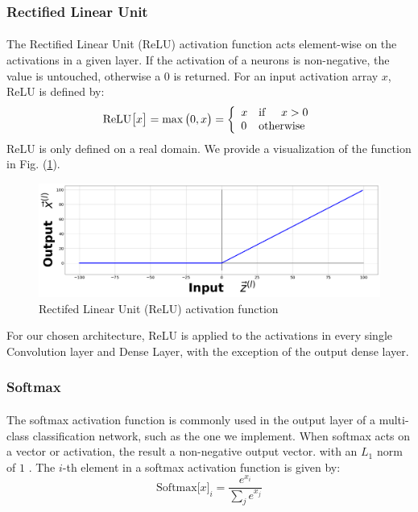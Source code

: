 \documentclass[12pt,letterpaper]{article}
\begin{document}
\subsubsection{Rectified Linear Unit}

\paragraph*{}The Rectified Linear Unit (ReLU) activation function acts element-wise on the activations in a given layer. If the activation of a neurons is non-negative, the value is untouched, otherwise a $0$ is returned. For an input activation array $x$, ReLU is defined by:
\begin{equation}
\label{eqn-ReLU}
\text{ReLU}\big[x\big] = \max\big(0,x\big) = \left\{
\begin{array}{ll}
    x & \text{if\hspace{0.5cm}} x > 0 \\
    0 & \text{otherwise}
\end{array} 
\right.
\end{equation}
ReLU is only defined on a real domain. We provide a visualization of the function in Fig. (\ref{fig-ReLU}).
\begin{figure}[H]
\begin{center}
\includegraphics[scale=0.25]{../Figures/RectifiedLinearUnit}
\end{center}
\caption{Rectifed Linear Unit (ReLU) activation function}
\label{fig-ReLU}
\end{figure}
For our chosen architecture, ReLU is applied to the activations in every single Convolution layer and Dense Layer, with the exception of the output dense layer.


\subsubsection{Softmax}
\label{subsubsec-Softmax}

\paragraph*{}The softmax activation function is commonly used in the output layer of a multi-class classification network, such as the one we implement. When softmax acts on a vector or activation, the result a non-negative output vector. with an $L_1$ norm of $1$ \cite{Geron,Goodfellow,Virtanen}. The $i$-th element in a softmax activation function is given by:
\begin{equation}
\label{eqn-Softmax}
\text{Softmax}\big[ x \big]_{i} = \frac{e^{x_i}}{\sum_{j}e^{x_j}}
\end{equation}
\end{document}
